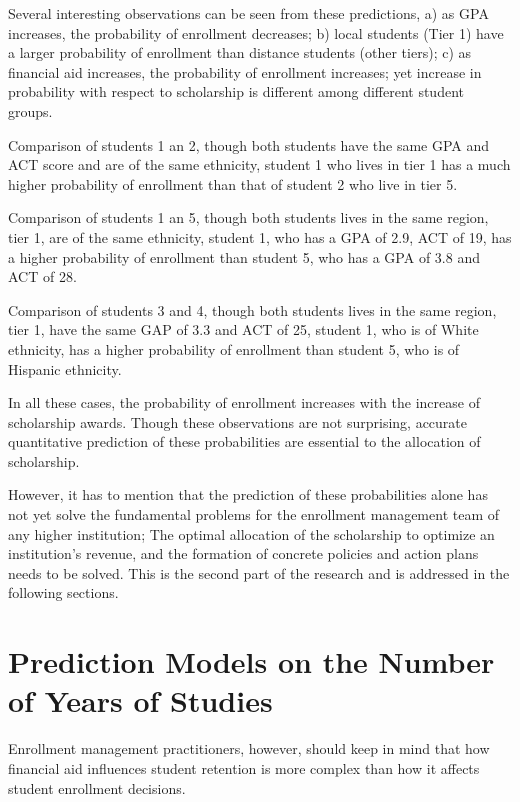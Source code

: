 \documentclass[12pt,english]{report}
\begin{document}
Several interesting observations can be seen from these predictions, a) as GPA
increases, the probability of enrollment decreases; b) local students (Tier 1)
have a larger probability of enrollment than distance students (other tiers);
c) as financial aid increases, the probability of enrollment increases; yet
increase in probability with respect to scholarship is different among
different student groups.

Comparison of students 1 an 2, though both students have the same GPA and ACT
score and are of the same ethnicity, student 1 who lives in tier 1 has a much
higher probability of enrollment than that of student 2 who live in tier 5.

Comparison of students 1 an 5, though both students lives in the same region,
tier 1, are of the same ethnicity, student 1, who has a GPA of 2.9, ACT of 19,
has a higher probability of enrollment than student 5, who has a GPA of 3.8 and
ACT of 28.

Comparison of students 3 and 4, though both students lives in the same region,
tier 1, have the same GAP of 3.3 and ACT of 25, student 1, who is of White
ethnicity, has a higher probability of enrollment than student 5, who is of
Hispanic ethnicity.

In all these cases, the probability of enrollment increases with the increase
of scholarship awards. Though these observations are not surprising, accurate
quantitative prediction of these probabilities are essential to the allocation
of scholarship.

However, it has to mention that the prediction of these probabilities alone has
not yet solve the fundamental problems for the enrollment management team of
any higher institution;  The optimal allocation of the scholarship to optimize
an institution's revenue, and the formation of concrete policies and action
plans needs to be solved. This is the second part of the research and is
addressed in the following sections.

\chapter {Prediction Models on the Number of Years of Studies}
Enrollment management practitioners, however, should keep in mind that how
financial aid influences student retention is more complex than how it affects
student enrollment decisions.
\end{document}

